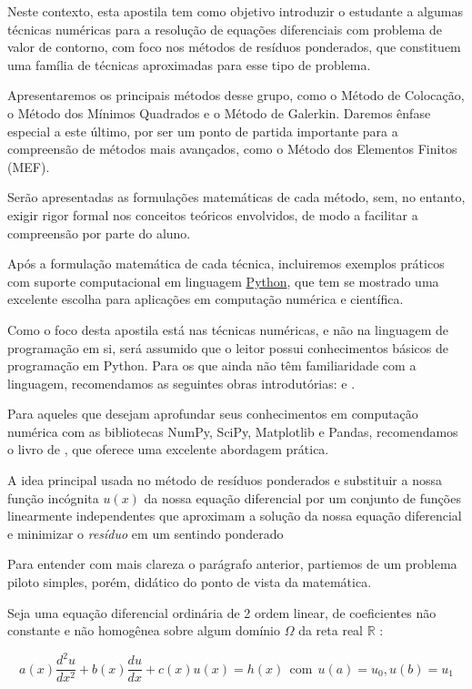 \documentclass[a4paper, 12pt]{article}
\numberwithin{equation}{section}
\begin{document}
Neste contexto, esta apostila tem como objetivo introduzir o estudante a algumas técnicas numéricas para a resolução de equações diferenciais com problema de valor de contorno, com foco nos métodos de resíduos ponderados, que constituem uma família de técnicas aproximadas para esse tipo de problema.

Apresentaremos os principais métodos desse grupo, como o Método de Colocação, o Método dos Mínimos Quadrados e o Método de Galerkin. Daremos ênfase especial a este último, por ser um ponto de partida importante para a compreensão de métodos mais avançados, como o Método dos Elementos Finitos (MEF).

Serão apresentadas as formulações matemáticas de cada método, sem, no entanto, exigir rigor formal nos conceitos teóricos envolvidos, de modo a facilitar a compreensão por parte do aluno.

Após a formulação matemática de cada técnica, incluiremos exemplos práticos com suporte computacional em linguagem \href{https://www.python.org/}{Python}, que tem se mostrado uma excelente escolha para aplicações em computação numérica e científica.

Como o foco desta apostila está nas técnicas numéricas, e não na linguagem de programação em si, será assumido que o leitor possui conhecimentos básicos de programação em Python. Para os que ainda não têm familiaridade com a linguagem, recomendamos as seguintes obras introdutórias: \citep{matthes} e \citep{sweigart}.

Para aqueles que desejam aprofundar seus conhecimentos em computação numérica com as bibliotecas NumPy, SciPy, Matplotlib e Pandas, recomendamos o livro de \citep{johansson}, que oferece uma excelente abordagem prática.

A idea principal usada no método de resíduos ponderados e substituir a nossa função incógnita $u(x)$ da nossa equação diferencial por um conjunto de funções linearmente independentes que  aproximam a solução da nossa equação diferencial e minimizar o \textit{resíduo} em um sentindo ponderado

Para entender com mais clareza o parágrafo anterior, partiemos de um problema piloto simples, porém, didático do ponto de vista da matemática. 

Seja uma equação diferencial ordinária de 2 ordem linear, de coeficientes não constante e não homogênea sobre algum domínio $\Omega$ da reta real $\mathbb{R}$ : 


\begin{equation}
    a(x) \dfrac{d^2u}{dx^2} + b(x)\dfrac{du}{dx} + c(x)u(x)  = h(x) \ \ \textrm{com} \ \ u(a) = u_0 ,  u(b) = u_1  \label{eq_governo}
\end{equation}
\end{document}
